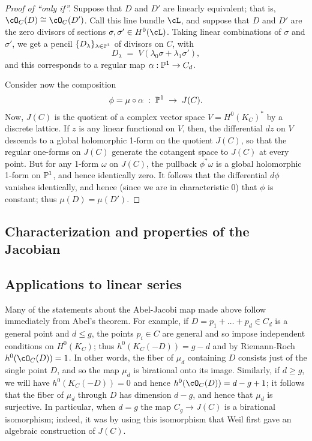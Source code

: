 \begin{proof}[Proof of ``only if'']
Suppose that $D$ and $D'$ are linearly equivalent; that is, $\cO_C(D) \cong \cO_C(D')$. Call this line bundle $\cL$, and suppose that $D$ and $D'$ are the zero divisors of sections $\sigma, \sigma' \in H^0(\cL)$.
Taking linear combinations of $\sigma$ and $\sigma'$, we get a pencil $\{D_\lambda\}_{\lambda \in \PP^1}$ of divisors on $C$, with
$$
D_\lambda \; = \; V(\lambda_0\sigma + \lambda_1\sigma'),
$$
and this corresponds to a regular map $\alpha : \PP^1 \to C_d$. 

Consider now the composition
$$
\phi = \mu \circ \alpha \; : \; \PP^1 \; \to \; J(C).
$$
Now, $J(C)$ is the quotient of a complex vector space $V = H^0(K_C)^*$ by a discrete lattice. If $z$ is any linear functional on $V$, then, the differential $dz$  on $V$ descends to a global holomorphic 1-form on the quotient $J(C)$, so that the regular one-forms on $J(C)$ generate the cotangent space to $J(C)$ at every point. But for any 1-form $\omega$ on $J(C)$, the pullback $\phi^*\omega$ is a global holomorphic 1-form on $\PP^1$, and hence identically zero. It follows that the differential $d\phi$ vanishes identically, and hence (since we are in characteristic 0) that $\phi$ is constant; thus $\mu(D) = \mu(D')$.
\end{proof}

\subsection{Characterization and properties of the Jacobian}

\subsection{Applications to linear series}
Many of the statements about the Abel-Jacobi map made above follow immediately from Abel's theorem. For example, if  $D = p_1+\dots+p_d\in C_d$ is a general point and $d \leq g$, the points $p_i \in C$ are general and so impose independent conditions on $H^0(K_C)$; thus $h^0(K_C(-D)) = g-d$ and by Riemann-Roch $h^0(\cO_C(D)) = 1$. In other words, the fiber of $\mu_d$ containing $D$ consists just of the single point $D$, and so the map $\mu_d$ is birational onto its image. Similarly, if $d \geq g$, we will have $h^0(K_C(-D)) = 0$ and hence $h^0(\cO_C(D)) = d-g+1$; it follows that the fiber of $\mu_d$ through $D$ has dimension $d-g$, and hence that $\mu_d$ is surjective. In particular, when $d=g$ the map $C_g \to J(C)$ is a birational isomorphism; indeed, it was by using this isomorphism that Weil first gave an algebraic construction of $J(C)$.

